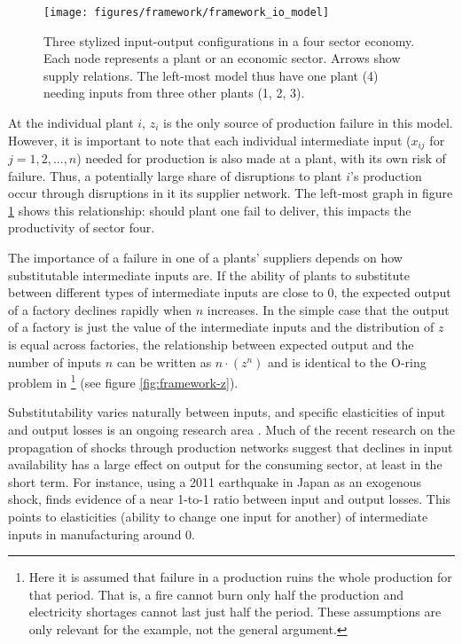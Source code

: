 \documentclass[11pt]{article}
\begin{document}
\begin{figure}[htpb]
	\centering
	\texttt{[image: figures/framework/framework\_io\_model]}
	\caption{Three stylized input-output configurations in a four sector economy. Each node represents a plant or an economic sector. Arrows show supply relations. The left-most model thus have one plant (4) needing inputs from three other plants (1, 2, 3).}%
	\label{fig:framework-io-model}
\end{figure}

At the individual plant \(i\), \(z_i\) is the only source of production failure in this model. However, it is important to note that each individual intermediate input (\(x_{ij}\) for \(j = 1, 2, ..., n\)) needed for production is also made at a plant, with its own risk of failure. Thus, a potentially large share of disruptions to plant $i$'s production occur through disruptions in it its supplier network. The left-most graph in figure \ref{fig:framework-io-model} shows this relationship: should plant one fail to deliver, this impacts the productivity of sector four.

The importance of a failure in one of a plants' suppliers depends on how substitutable intermediate inputs are. If the ability of plants to substitute between different types of intermediate inputs are close to 0, the expected output of a factory declines rapidly when \(n\) increases. In the simple case that the output of a factory is just the value of the intermediate inputs and the distribution of \(z\) is equal across factories, the relationship between expected output and the number of inputs \(n\) can be written as \(n\cdot(z^{n})\) and is identical to the O-ring problem in \cite{kremer_o-ring_1993}\footnote{Here it is assumed that failure in a production ruins the whole production for that period. That is, a fire cannot burn only half the production and electricity shortages cannot last just half the period. These assumptions are only relevant for the example, not the general argument.} (see figure \ref{fig:framework-z}).

Substitutability varies naturally between inputs, and specific elasticities of input and output losses is an ongoing research area \citep{brummitt_contagious_2017,carvalho_micro_2014}. Much of the recent research on the propagation of shocks through production networks suggest that declines in input availability has a large effect on output for the consuming sector, at least in the short term. For instance, using a 2011 earthquake in Japan as an exogenous shock, \cite{boehm_input_2019-1} finds evidence of a near 1-to-1 ratio between input and output losses. This points to elasticities (ability to change one input for another) of intermediate inputs in manufacturing around 0.
\end{document}
